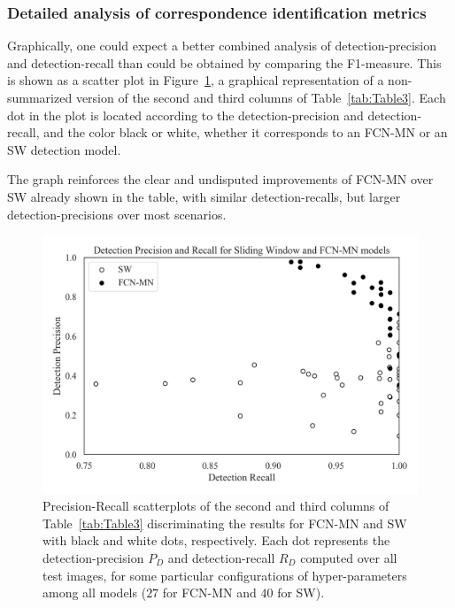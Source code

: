 \documentclass[a4paper,authoryear,review]{elsarticle}
\begin{document}
\begin{table}[]
{		}
		\label{tab:Table3}
	\end{table}
	
	
	\subsubsection{Detailed analysis of correspondence identification metrics}
	\label{sub:compFCNSW}
	
	Graphically, one could expect a better combined analysis of detection-precision and detection-recall than could be obtained by comparing the F1-measure. This is shown as a scatter plot in Figure~\ref{fig:Figure3}, a graphical representation of a non-summarized version of the second and third columns of Table~\ref{tab:Table3}. Each dot  in the plot is located according to the detection-precision and detection-recall, and the color black or white, whether it corresponds to an FCN-MN or an SW detection model.
	
	The graph reinforces the clear and undisputed improvements of FCN-MN over SW already shown in the table, with similar detection-recalls, but larger detection-precisions over most scenarios. 
	
	
	\begin{figure}
		\centering
		\includegraphics[width=\textwidth]{figures/Figure3.png}
		\caption{
			Precision-Recall scatterplots of the second and third columns of Table~\ref{tab:Table3} discriminating the results for FCN-MN and SW with black and white dots, respectively. Each dot represents the detection-precision $P_D$ and detection-recall $R_D$ computed over all test images, for some particular configurations of hyper-parameters among all models ($27$ for FCN-MN  and $40$ for SW).
		}
		\label{fig:Figure3}
	\end{figure}
	
\end{document}
